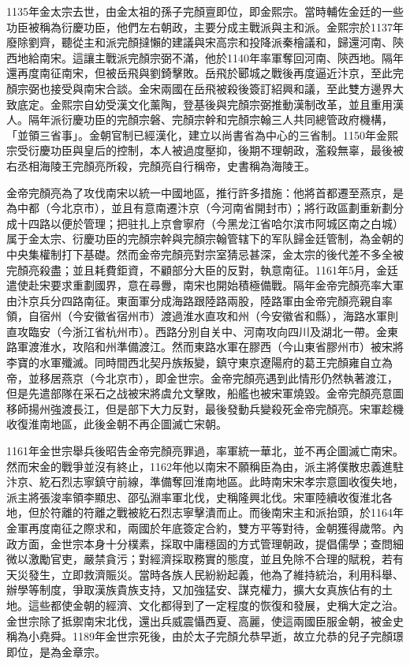 1135年金太宗去世，由金太祖的孫子完顏亶即位，即金熙宗。當時輔佐金廷的一些功臣被稱為衍慶功臣，他們左右朝政，主要分成主戰派與主和派。金熙宗於1137年廢除劉齊，聽從主和派完顏撻懶的建議與宋高宗和投降派秦檜議和，歸還河南、陝西地給南宋。這讓主戰派完顏宗弼不滿，他於1140年率軍奪回河南、陝西地。隔年還再度南征南宋，但被岳飛與劉錡擊敗。岳飛於郾城之戰後再度逼近汴京，至此完顏宗弼也接受與南宋合談。金宋兩國在岳飛被殺後簽訂紹興和議，至此雙方邊界大致底定。金熙宗自幼受漢文化薰陶，登基後與完顏宗弼推動漢制改革，並且重用漢人。隔年派衍慶功臣的完顏宗磐、完顏宗幹和完顏宗翰三人共同總管政府機構，「並領三省事」。金朝官制已經漢化，建立以尚書省為中心的三省制。1150年金熙宗受衍慶功臣與皇后的控制，本人被過度壓抑，後期不理朝政，濫殺無辜，最後被右丞相海陵王完顏亮所殺，完顏亮自行稱帝，史書稱為海陵王。

金帝完顏亮為了攻伐南宋以統一中國地區，推行許多措施：他將首都遷至燕京，是為中都（今北京市），並且有意南遷汴京（今河南省開封市）；將行政區劃重新劃分成十四路以便於管理；把驻扎上京會寧府（今黑龙江省哈尔滨市阿城区南之白城）属于金太宗、衍慶功臣的完顏宗幹與完顏宗翰管辖下的军队歸金廷管制，為金朝的中央集權制打下基礎。然而金帝完顏亮對宗室猜忌甚深，金太宗的後代差不多全被完顏亮殺盡；並且耗費鉅資，不顧部分大臣的反對，執意南征。1161年5月，金廷遣使赴宋要求重劃國界，意在尋釁，南宋也開始積極備戰。隔年金帝完顏亮率大軍由汴京兵分四路南征。東面軍分成海路跟陸路兩股，陸路軍由金帝完顏亮親自率領，自宿州（今安徽省宿州市）渡過淮水直攻和州（今安徽省和縣），海路水軍則直攻臨安（今浙江省杭州市）。西路分別自关中、河南攻向四川及湖北一帶。金東路軍渡淮水，攻陷和州準備渡江。然而東路水軍在膠西（今山東省膠州市）被宋將李寶的水軍殲滅。同時間西北契丹族叛變，鎮守東京遼陽府的葛王完顏雍自立為帝，並移居燕京（今北京市），即金世宗。金帝完顏亮遇到此情形仍然執著渡江，但是先遣部隊在采石之战被宋將虞允文擊敗，船艦也被宋軍燒毀。金帝完顏亮意圖移師揚州強渡長江，但是部下大力反對，最後發動兵變殺死金帝完顏亮。宋軍趁機收復淮南地區，此後金朝不再企圖滅亡宋朝。

1161年金世宗舉兵後昭告金帝完顏亮罪過，率軍統一華北，並不再企圖滅亡南宋。然而宋金的戰爭並沒有終止，1162年他以南宋不願稱臣為由，派主將僕散忠義進駐汴京、紇石烈志寧鎮守前線，準備奪回淮南地區。此時南宋宋孝宗意圖收復失地，派主將張浚率領李顯忠、邵弘淵率軍北伐，史稱隆興北伐。宋軍陸續收復淮北各地，但於符離的符離之戰被紇石烈志寧擊潰而止。而後南宋主和派抬頭，於1164年金軍再度南征之際求和，兩國於年底簽定合約，雙方平等對待，金朝獲得歲幣。內政方面，金世宗本身十分樸素，採取中庸穩固的方式管理朝政，提倡儒學；查問細微以激勵官吏，嚴禁貪污；對經濟採取務實的態度，並且免除不合理的賦稅，若有天災發生，立即救濟賑災。當時各族人民紛紛起義，他為了維持統治，利用科舉、辦學等制度，爭取漢族貴族支持，又加強猛安、謀克權力，擴大女真族佔有的土地。這些都使金朝的經濟、文化都得到了一定程度的恢復和發展，史稱大定之治。金世宗除了抵禦南宋北伐，還出兵威震懾西夏、高麗，使這兩國臣服金朝，被金史稱為小堯舜。1189年金世宗死後，由於太子完顏允恭早逝，故立允恭的兒子完顏璟即位，是為金章宗。


